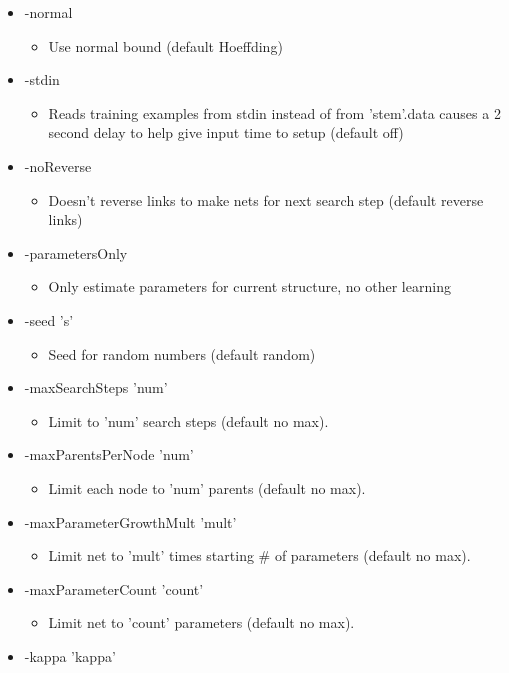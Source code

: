 \begin{itemize}
\item -normal\begin{itemize}
\item Use normal bound (default Hoeffding)\end{itemize}
\item -stdin\begin{itemize}
\item Reads training examples from stdin instead of from 'stem'.data causes a 2 second delay to help give input time to setup (default off)\end{itemize}
\item -no\-Reverse\begin{itemize}
\item Doesn't reverse links to make nets for next search step (default reverse links)\end{itemize}
\item -parameters\-Only\begin{itemize}
\item Only estimate parameters for current structure, no other learning\end{itemize}
\item -seed 's'\begin{itemize}
\item Seed for random numbers (default random)\end{itemize}
\item -max\-Search\-Steps 'num'\begin{itemize}
\item Limit to 'num' search steps (default no max).\end{itemize}
\item -max\-Parents\-Per\-Node 'num'\begin{itemize}
\item Limit each node to 'num' parents (default no max).\end{itemize}
\item -max\-Parameter\-Growth\-Mult 'mult'\begin{itemize}
\item Limit net to 'mult' times starting \# of parameters (default no max).\end{itemize}
\item -max\-Parameter\-Count 'count'\begin{itemize}
\item Limit net to 'count' parameters (default no max).\end{itemize}
\item -kappa 'kappa'\begin{itemize}

\end{itemize}
\end{itemize}
